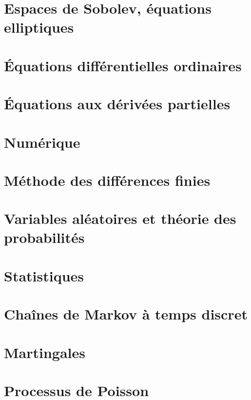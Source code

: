 \documentclass[a4paper,twoside,11pt]{book}
\begin{document}
\chapter{Espaces de Sobolev, équations elliptiques}      \label{CHAPooVTIIooGOEvXT}


\chapter{Équations différentielles ordinaires}





\chapter{Équations aux dérivées partielles}


\chapter{Numérique}





\chapter{Méthode des différences finies}


\chapter{Variables aléatoires et théorie des probabilités}





\chapter{Statistiques}


\chapter{Chaînes de Markov à temps discret}


\chapter{Martingales}


\chapter{Processus de Poisson}

\end{document}
